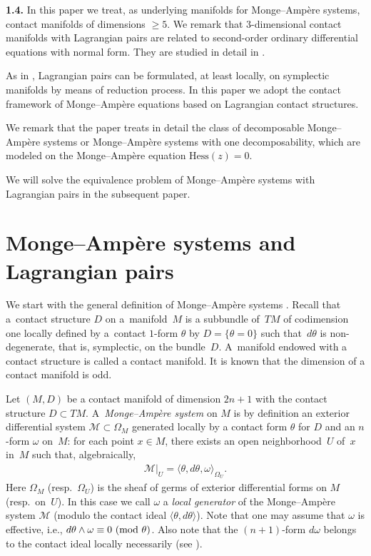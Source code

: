 \documentclass[pdftex]{sigma}
\begin{document}
{\bf 1.4.}
In this paper we treat, as underlying manifolds for Monge--Amp{\`e}re
systems, contact manifolds of dimensions $\geq 5$.
We remark that $3$-dimensional contact manifolds with
Lagrangian pairs
are related to second-order ordinary dif\/ferential equations
with normal form. They are studied in detail in \cite{A,I-L}.

As in \cite{B1,B2,K-L-R, L-R-C},
Lagrangian pairs can be formulated, at least locally,
on symplectic manifolds by means of reduction process.
In this paper we adopt
the contact framework of Monge--Amp{\`e}re equations based on Lagrangian
contact structures.

We remark that the paper \cite{M-M} treats in detail
the class of decomposable Monge--Amp{\`e}re systems
or Monge--Amp{\`e}re systems with one decomposability, which
are modeled on the Monge--Amp{\`e}re equation
$\mathrm{Hess}(z) =0$.

We will solve the equivalence problem of Monge--Amp{\`e}re systems with Lagrangian
pairs in the subsequent paper.



\section[Monge-Amp{\`e}re systems and Lagrangian pairs]{Monge--Amp{\`e}re systems and Lagrangian pairs}
\label{Monge-Ampere systems and Lagrangian pairs}

We start with the general def\/inition of Monge--Amp{\`e}re systems
\cite{B-G-G,L, Mo1,Mo2}.
Recall that a~contact structure $D$ on a~mani\-fold~$M$
is a subbundle of~$TM$ of codimension one locally def\/ined by a~contact
$1$-form $\theta$ by $D = \{ \theta = 0\}$ such that~$d\theta$ is non-degenerate,
that is, symplectic, on the bundle~$D$.
A~manifold endowed with a contact structure is called a contact manifold.
It is known that the dimension of a contact manifold is odd.

Let $(M, D)$ be a contact manifold of dimension $2n+1$ with
the contact structure \mbox{$D \subset TM$}.
A~{\it Monge--Amp{\`e}re system}
on $M$ is by def\/inition an exterior dif\/ferential system ${\mathcal M} \subset \Omega_M$
ge\-ne\-rated locally by a contact form $\theta$ for $D$ and an
$n$-form $\omega$ on~$M$: for each point $x \in M$,
there exists an open neighborhood~$U$ of~$x$ in~$M$ such that,
algebraically,
\begin{gather*}
{\mathcal M}\vert_U =
\langle \theta, d\theta, \omega
\rangle_{\Omega_U}.
\end{gather*}
Here $\Omega_M$ (resp.\ $\Omega_U$)
is the sheaf of germs of
exterior dif\/ferential forms
on $M$ (resp.\ on~$U$). In this case we call
$\omega$ a {\it local generator} of the Monge--Amp{\`e}re system
${\mathcal M}$ (modulo the contact ideal $\langle \theta, d\theta \rangle$).
Note that one may assume that $\omega$ is ef\/fective, i.e.,
$d\theta \wedge \omega \equiv
0\ (\rm{mod}\ \theta)$.
Also note that the $(n+1)$-form
$d\omega$ belongs to the contact ideal locally necessarily (see \cite{B1,B2, L}).
\end{document}
